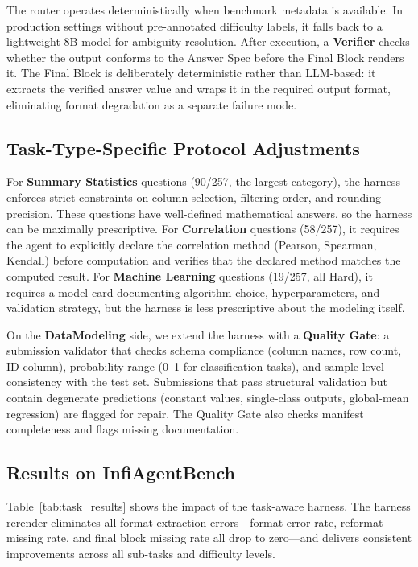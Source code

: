 \documentclass[letterpaper]{article} %
\begin{document}
The router operates deterministically when benchmark metadata is available. In production settings without pre-annotated difficulty labels, it falls back to a lightweight 8B model for ambiguity resolution. After execution, a \textbf{Verifier} checks whether the output conforms to the Answer Spec before the Final Block renders it. The Final Block is deliberately deterministic rather than LLM-based: it extracts the verified answer value and wraps it in the required output format, eliminating format degradation as a separate failure mode.

\subsection{Task-Type-Specific Protocol Adjustments}

For \textbf{Summary Statistics} questions (90/257, the largest category), the harness enforces strict constraints on column selection, filtering order, and rounding precision. These questions have well-defined mathematical answers, so the harness can be maximally prescriptive. For \textbf{Correlation} questions (58/257), it requires the agent to explicitly declare the correlation method (Pearson, Spearman, Kendall) before computation and verifies that the declared method matches the computed result. For \textbf{Machine Learning} questions (19/257, all Hard), it requires a model card documenting algorithm choice, hyperparameters, and validation strategy, but the harness is less prescriptive about the modeling itself.

On the \textbf{DataModeling} side, we extend the harness with a \textbf{Quality Gate}: a submission validator that checks schema compliance (column names, row count, ID column), probability range (0--1 for classification tasks), and sample-level consistency with the test set. Submissions that pass structural validation but contain degenerate predictions (constant values, single-class outputs, global-mean regression) are flagged for repair. The Quality Gate also checks manifest completeness and flags missing documentation.

\subsection{Results on InfiAgentBench}

Table~\ref{tab:task_results} shows the impact of the task-aware harness. The harness rerender eliminates all format extraction errors---format error rate, reformat missing rate, and final block missing rate all drop to zero---and delivers consistent improvements across all sub-tasks and difficulty levels.
\end{document}

